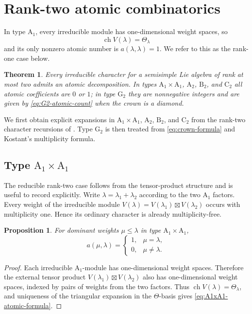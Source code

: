 \documentclass[11pt]{article}
\newtheorem{theorem}{Theorem}[section]
\newtheorem{proposition}[proposition]{Proposition}
\theoremstyle{definition}
\theoremstyle{remark}
\newcommand{\chr}{\operatorname{ch}}
\newcommand{\typeA}{\ensuremath{\mathrm{A}}}
\newcommand{\typeB}{\ensuremath{\mathrm{B}}}
\newcommand{\typeC}{\ensuremath{\mathrm{C}}}
\newcommand{\typeG}{\ensuremath{\mathrm{G}}}
\begin{document}
\section{Rank-two atomic combinatorics}\label{sec:rank2}

In type $\typeA_1$, every irreducible module has one-dimensional weight
spaces, so
\[
 \chr V(\lambda)=\Theta_\lambda
\]
and its only nonzero atomic number is $a(\lambda,\lambda)=1$.  We refer
to this as the rank-one case below.

\begin{theorem}\label{thm:rank2-all}
Every irreducible character for a semisimple Lie algebra of rank at most two
admits an atomic decomposition.  In types
$\typeA_1\times\typeA_1$, $\typeA_2$, $\typeB_2$, and $\typeC_2$ all atomic
coefficients are $0$ or $1$; in type $\typeG_2$ they are nonnegative integers
and are given by \eqref{eq:G2-atomic-count} when the crown is a diamond.
\end{theorem}

We first obtain explicit expansions in
$\typeA_1\times\typeA_1$, $\typeA_2$, $\typeB_2$, and $\typeC_2$ from
the rank-two character recursions of \cite{Schutzer}.  Type $\typeG_2$ is
then treated from \eqref{eq:crown-formula} and Kostant's multiplicity formula.

\subsection{Type $\typeA_1\times\typeA_1$}

The reducible rank-two case follows from the tensor-product structure and is
useful to record explicitly.
Write $\lambda=\lambda_1+\lambda_2$ according to the two $\typeA_1$ factors.
Every weight of the irreducible module
$V(\lambda)=V(\lambda_1)\boxtimes V(\lambda_2)$ occurs with multiplicity
one.  Hence its ordinary character is already multiplicity-free.

\begin{proposition}
\label{prop:A1xA1-direct}
For dominant weights $\mu\le\lambda$ in type
$\typeA_1\times\typeA_1$,
\begin{equation}\label{eq:A1xA1-atomic-formula}
 a(\mu,\lambda)=
 \begin{cases}
  1,&\mu=\lambda,\\
  0,&\mu\ne\lambda.
 \end{cases}
\end{equation}
\end{proposition}

\begin{proof}
Each irreducible $\typeA_1$-module has one-dimensional weight spaces.  Therefore
the external tensor product $V(\lambda_1)\boxtimes V(\lambda_2)$ also has
one-dimensional weight spaces, indexed by pairs of weights from the two
factors.  Thus $\chr V(\lambda)=\Theta_\lambda$, and uniqueness of the
triangular expansion in the $\Theta$-basis gives
\eqref{eq:A1xA1-atomic-formula}.
\end{proof}
\end{document}
